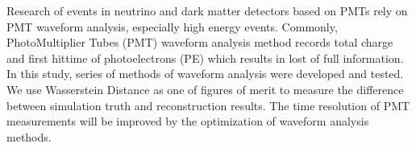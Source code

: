 Research of events in neutrino and dark matter detectors based on PMTs rely on PMT waveform analysis, especially high energy events. Commonly, PhotoMultiplier Tubes (PMT) waveform analysis method records total charge and first hittime of photoelectrons (PE) which results in lost of full information. In this study, series of methods of waveform analysis were developed and tested. We use Wasserstein Distance as one of figures of merit to measure the difference between simulation truth and reconstruction results. The time resolution of PMT measurements will be improved by the optimization of waveform analysis methods. 